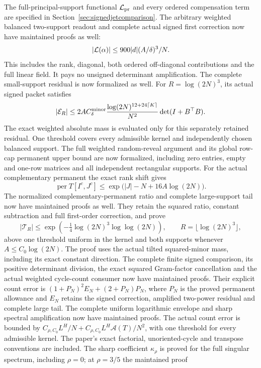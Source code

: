 \documentclass[11pt]{article}
\theoremstyle{remark}
\begin{document}
The full-principal-support functional \({\cal L}_{\rm pr}\) and
every ordered compensation term are specified in
Section~\ref{sec:signedjetcomparison}. The arbitrary weighted
balanced two-support readout and complete actual signed first
correction now have maintained proofs as well:
\[
 \left|{\cal L}(\alpha)\right|
          \leq900|d|(A/\delta)^3/N.
\]
This includes the rank, diagonal, both ordered off-diagonal
contributions and the full linear field. It pays no unsigned
determinant amplification. The complete small-support residual is
now formalized as well. For \(R=\log(2N)^3\), its actual signed
packet satisfies
\[
 |\mathcal E_R|\leq
 2A C_\delta^{\rm minor}\frac{\log(2N)^{12+24\lceil K\rceil}}{N^2}
                   \det(I+B^\top B).
\]
The exact weighted absolute mass is evaluated only for this
separately retained residual. One threshold covers every admissible
kernel and independently chosen balanced support.
The full weighted random-reveal argument and its global row-cap
permanent upper bound are now formalized, including zero entries,
empty and one-row matrices and all independent rectangular supports.
For the actual complementary permanent the exact rank shift gives
\[
 \operatorname{per}T[I^c,J^c]
       \leq \exp\bigl(|J|-N+16A\log(2N)\bigr).
\]
The normalized complementary-permanent ratio and complete large-support
tail now have maintained proofs as well.  They retain the squared ratio,
constant subtraction and full first-order correction, and prove
\[
 |\mathcal T_R|\leq
 \exp\!\left(-\tfrac14\log(2N)^3\log\log(2N)\right),
 \qquad R=\lfloor\log(2N)^3\rfloor,
\]
above one threshold uniform in the kernel and both supports whenever
\(A\leq C_0\log(2N)\).  The proof uses the actual tilted squared-minor
mass, including its exact constant direction.
The complete finite signed comparison, its positive determinant division,
the exact squared Gram-factor cancellation and the actual weighted
cycle-count consumer now have maintained proofs.  Their explicit count
error is \((1+P_N)^2E_N+(2+P_N)P_N\), where \(P_N\) is the proved
permanent allowance and \(E_N\) retains the signed correction, amplified
two-power residual and complete large tail.
The complete uniform logarithmic envelope and sharp spectral amplification
now have maintained proofs.  The actual count error is bounded by
\(C_{\rho,C_0}L^H/N+C_{\rho,C_0}L^H\mathcal A(T)/N^2\), with one
threshold for every admissible kernel.  The paper's exact factorial,
unoriented-cycle and transpose conventions are included.
The sharp coefficient \(\kappa_\rho\) is proved for the full singular
spectrum, including \(\rho=0\); at \(\rho=3/5\) the maintained proof
\end{document}
